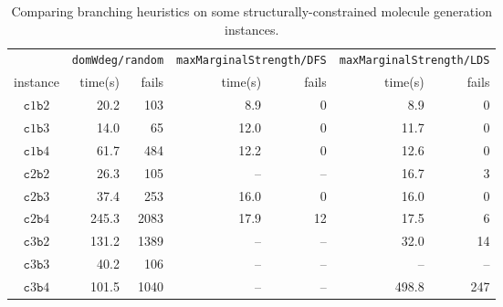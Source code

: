 \documentclass[../Document.tex]{subfiles}
\begin{document}
\begin{table}[]
    \centering
    \begin{tabular}{crrrrrr}
    \hline
      & \multicolumn{2}{c}{\texttt{domWdeg/random}} &  \multicolumn{2}{c}{\texttt{maxMarginalStrength/DFS}} & \multicolumn{2}{c}{\texttt{maxMarginalStrength/LDS}}\\
      instance & time(s) & fails & time(s) & fails & time(s) & fails \\
    \hline
     $\mathtt{c}1\mathtt{b}2$ & 20.2 & 103 &  8.9 & 0 & 8.9 & 0\\
     $\mathtt{c}1\mathtt{b}3$ & 14.0 & 65 &  12.0 & 0 & 11.7 & 0\\
     $\mathtt{c}1\mathtt{b}4$ & 61.7 & 484 & 12.2 & 0 & 12.6 & 0\\
     $\mathtt{c}2\mathtt{b}2$ & 26.3 & 105 &  -- & -- & 16.7 & 3\\
     $\mathtt{c}2\mathtt{b}3$ & 37.4 & 253 & 16.0 & 0 & 16.0 & 0\\
     $\mathtt{c}2\mathtt{b}4$ & 245.3 & 2083 &  17.9 & 12 & 17.5 & 6\\
     $\mathtt{c}3\mathtt{b}2$ & 131.2 & 1389 & -- & -- & 32.0 & 14\\
     $\mathtt{c}3\mathtt{b}3$ & 40.2 & 106 &  -- & -- & -- & --\\
     $\mathtt{c}3\mathtt{b}4$ & 101.5 & 1040 &  -- & -- & 498.8 & 247\\
    \hline
    \end{tabular}
    \caption{Comparing branching heuristics on some structurally-constrained molecule generation instances.}
    \label{tab:results}
\end{table}
\end{document}
